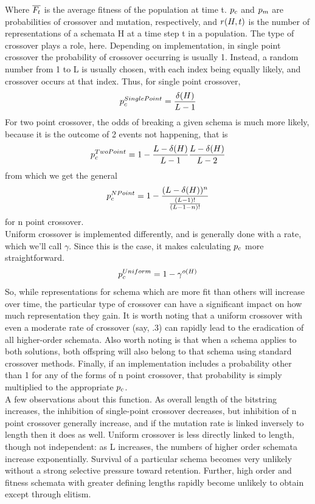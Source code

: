 Where $\overline{F_t}$ is the average fitness of the population at time t.  $p_c$ and $p_m$ are probabilities of crossover and mutation, respectively, and $r(H, t)$ is the number of representations of a schemata H at a time step t in a population.  The type of crossover plays a role, here.  Depending on implementation, in single point crossover the probability of crossover occurring is usually 1.  Instead, a random number from 1 to L is usually chosen, with each index being equally likely, and crossover occurs at that index. Thus, for single point crossover, $$p_c^{SinglePoint} = \frac{\delta(H)}{L-1} $$ For two point crossover, the odds of breaking a given schema is much more likely, because it is the outcome of 2 events not happening, that is $$p_c^{TwoPoint} = 1-\frac{L-\delta(H)}{L-1} \frac{L-\delta(H)}{L-2} $$ from which we get the general $$p_c^{NPoint} = 1- \frac{(L-\delta(H))^n}{\frac{(L-1)!}{(L-1-n)!}} $$
for n point crossover. \\Uniform crossover is implemented differently, and is generally done with a rate, which we'll call $\gamma$.  Since this is the case, it makes calculating $p_c$ more straightforward.  
$$p_c^{Uniform} = 1 - \gamma^{o(H)} $$So, while representations for schema which are more fit than others will increase over time, the particular type of crossover can have a significant impact on how much representation they gain.  It is worth noting that a uniform crossover with even a moderate rate of crossover (say, .3) can rapidly lead to the eradication of all higher-order schemata.  Also worth noting is that when a schema applies to both solutions, both offspring will also belong to that schema using standard crossover methods.  Finally, if an implementation includes a probability other than 1 for any of the forms of n point crossover, that probability is simply multiplied to the appropriate $p_c$.\\
A few observations about this function.  As overall length of the bitstring increases, the inhibition of single-point crossover decreases, but inhibition of n point crossover generally increase, and if the mutation rate is linked inversely to length then it does as well.  Uniform crossover is less directly linked to length, though not independent: as L increases, the numbers of higher order schemata increase exponentially.  Survival of a particular schema becomes very unlikely without a strong selective pressure toward retention. Further, high order and fitness schemata with greater defining lengths rapidly become unlikely to obtain except through elitism.  
\\
